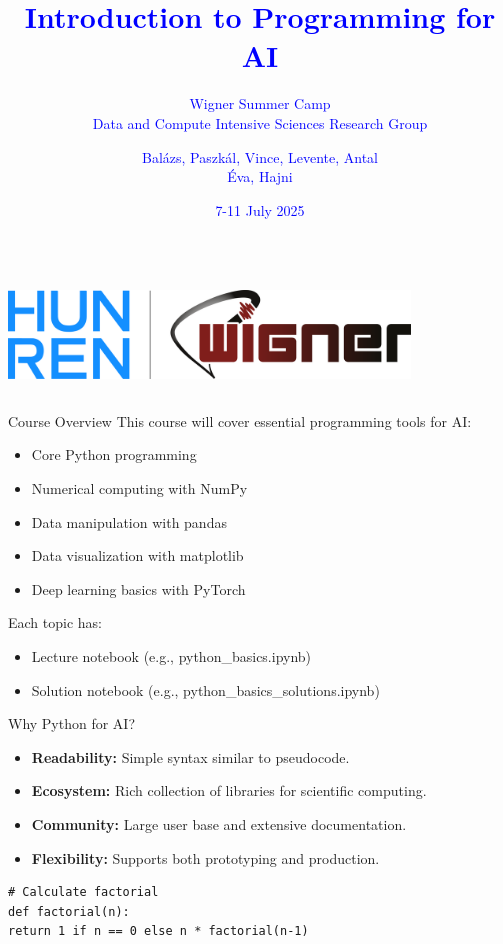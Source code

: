 \documentclass{beamer}
\title{\textcolor{blue}{Introduction to Programming for AI}}
\subtitle{\textcolor{blue}{Wigner Summer Camp \\ Data and Compute Intensive Sciences Research Group}}
\author{\textcolor{blue}{Balázs, Paszkál, Vince, Levente, Antal \\ Éva, Hajni}}
\date{\textcolor{blue}{7-11 July 2025}}
\begin{document}
	
	\begin{frame}
		\titlepage
		\begin{columns}
			\centering
			\centering
			\includegraphics[width=0.8\textwidth]{../img/logo.png}
		\end{columns}
	\end{frame}
	
	\begin{frame}{Course Overview}
		This course will cover essential programming tools for AI:
		\begin{itemize}
			\item Core Python programming
			\item Numerical computing with NumPy
			\item Data manipulation with pandas
			\item Data visualization with matplotlib
			\item Deep learning basics with PyTorch
		\end{itemize}
		
		Each topic has:
		\begin{itemize}
			\item Lecture notebook (e.g., python\_basics.ipynb)
			\item Solution notebook (e.g., python\_basics\_solutions.ipynb)
		\end{itemize}
	\end{frame}
	
	\begin{frame}[fragile]{Why Python for AI?}
	    \begin{itemize}
			\item \textbf{Readability:} Simple syntax similar to pseudocode.
			\item \textbf{Ecosystem:} Rich collection of libraries for scientific computing.
			\item \textbf{Community:} Large user base and extensive documentation.
			\item \textbf{Flexibility:} Supports both prototyping and production.
		\end{itemize}
	
		\begin{example}
			\begin{lstlisting}
# Calculate factorial
def factorial(n):
return 1 if n == 0 else n * factorial(n-1)
			\end{lstlisting}
		\end{example}
	\end{frame}
	
\end{document}
